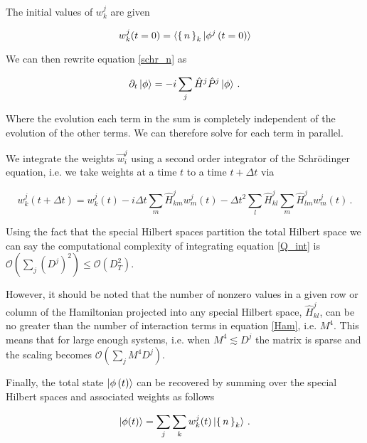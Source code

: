 \documentclass[aps,prd,twocolumn,superscriptaddress]{revtex4-1}
\begin{document}
The initial values of $w^j_k$ are given 

\begin{equation}
    w^j_k(t=0) = \braket{\set{n}_k | \phi^j \, (t=0)}
\end{equation}

We can then rewrite equation \eqref{schr_n} as

\begin{equation}
    \partial_t \ket{\phi} = -i \sum_j \hat H^j \hat P^j \ket{\phi} \, .
\end{equation}

Where the evolution each term in the sum is completely independent of the evolution of the other terms. We can therefore solve for each term in parallel.

\begin{widetext}

We integrate the weights $\vec w^j_i$ using a second order integrator of the Schr\"odinger equation, i.e. we take weights at a time $t$ to a time $t + \Delta t$ via

\begin{equation} \label{Q_int}
    w^j_k(t + \Delta t) = w_k^j(t) - i \Delta t \sum_m \hat H_{km}^j w^j_m(t) - \Delta t^2 \sum_l \hat H_{kl}^j \sum_m \hat H_{lm}^j w^j_m(t) \, .
\end{equation}

\end{widetext}

Using the fact that the special Hilbert spaces partition the total Hilbert space we can say the computational complexity of integrating equation \eqref{Q_int} is $\mathcal{O}(\sum_j (D^{j})^2) \le \mathcal{O}(D_T^2)$. 

However, it should be noted that the number of nonzero values in a given row or column of the Hamiltonian projected into any special Hilbert space, $\hat H^j_{kl}$, can be no greater than the number of interaction terms in equation \eqref{Ham}, i.e. $M^4$. This means that for large enough systems, i.e. when $M^4 \lesssim D^j$ the matrix is sparse and the scaling becomes $\mathcal{O}(\sum_j M^4 D^{j})$.

Finally, the total state $\ket{\phi\,(t)}$ can be recovered by summing over the special Hilbert spaces and associated weights as follows

\begin{equation}
    \ket{\phi (t)} = \sum_j \sum_k w^j_{k}(t) \ket{\set{n}_k} \, .
\end{equation}
\end{document}
